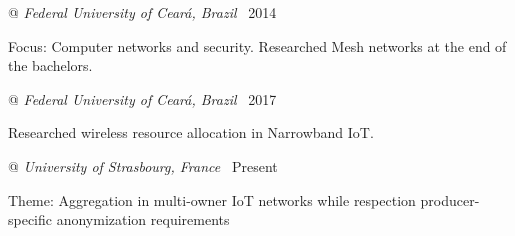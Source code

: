
 @ \textit{Federal University of Ceará, Brazil}
\dotfill {} \textemdash\  2014

{\small \enspace Focus: Computer networks and security. Researched Mesh networks at the end of the bachelors.}
\smallskip

 @ \textit{Federal University of Ceará, Brazil}
\dotfill {} \textemdash\  2017

{\small \enspace Researched wireless resource allocation in Narrowband IoT.}
\smallskip


 @ \textit{University of Strasbourg, France}
\dotfill {} \textemdash\  Present

{\small \enspace Theme: Aggregation in multi-owner IoT networks while respection producer-specific anonymization requirements}
